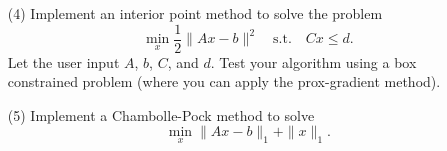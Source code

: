 \documentclass[11pt]{amsart}
\begin{document}
\begin{enumerate}

\item[(4)] Implement an interior point method to solve the problem 
\[
\min_x \frac{1}{2}\|Ax-b\|^2 \quad \mbox{s.t.} \quad Cx \leq d. 
\]
Let the user input $A$, $b$, $C$, and $d$. Test your algorithm using a box constrained problem 
(where you can apply the prox-gradient method). 

\bigskip\bigskip\bigskip






\bigskip\bigskip\bigskip



\item[(5)] Implement a Chambolle-Pock method to solve  
\[
\min_{x} \|Ax-b\|_1 + \|x\|_1. 
\]





\end{enumerate}
\end{document}
